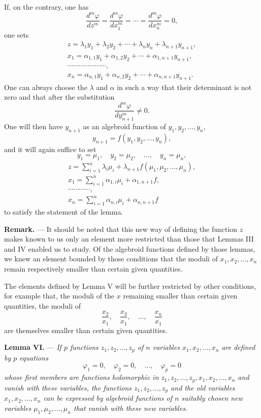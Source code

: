 \documentclass[11pt]{article}
\begin{document}
If, on the contrary, one has
\[
\frac{d^m\varphi}{dz^m}=\frac{d^m\varphi}{dx_1^m}=\cdots=\frac{d^m\varphi}{dx_n^m}=0,
\]
one sets
\[
\begin{gathered}
z=\lambda_1y_1+\lambda_2y_2+\cdots+\lambda_ny_n+\lambda_{n+1}y_{n+1},\\
x_1=\alpha_{1,1}y_1+\alpha_{1,2}y_2+\cdots+\alpha_{1,n+1}y_{n+1},\\
\cdots\cdots\cdots\cdots\cdots\cdots\cdots,\\
x_n=\alpha_{n,1}y_1+\alpha_{n,2}y_2+\cdots+\alpha_{n,n+1}y_{n+1}.
\end{gathered}
\]
One can always choose the $\lambda$ and $\alpha$ in such a way that their determinant is not zero and that after the substitution
\[
\frac{d^m\varphi}{dy_{n+1}^m}\ne0.
\]
One will then have $y_{n+1}$ as an algebroid function of $y_1,y_2,\ldots,y_n$,
\[
y_{n+1}=f(y_1,y_2,\ldots,y_n),
\]
and it will again suffice to set
\[
y_1=\mu_1,
\quad y_2=\mu_2,
\quad \ldots,
\quad y_n=\mu_n,
\]
\[
\begin{gathered}
z=\sum_{i=1}^{n}\lambda_i\mu_i+\lambda_{n+1}f(\mu_1,\mu_2,\ldots,\mu_n),\\
x_1=\sum_{i=1}^{n}\alpha_{1,i}\mu_i+\alpha_{1,n+1}f,\\
\cdots\cdots\cdots\cdots,\\
x_n=\sum_{i=1}^{n}\alpha_{n,i}\mu_i+\alpha_{n,n+1}f
\end{gathered}
\]
to satisfy the statement of the lemma.

\medskip
\noindent\textbf{Remark.} — It should be noted that this new way of defining the function $z$ makes known to us only an element more restricted than those that Lemmas III and IV enabled us to study. Of the algebroid functions defined by those lemmas, we knew an element bounded by those conditions that the moduli of $x_1,x_2,\ldots,x_n$ remain respectively smaller than certain given quantities.

The elements defined by Lemma V will be further restricted by other conditions, for example that, the moduli of the $x$ remaining smaller than certain given quantities, the moduli of
\[
\frac{x_2}{x_1},\quad \frac{x_3}{x_1},\quad \ldots,
\quad \frac{x_n}{x_1}
\]
are themselves smaller than certain given quantities.

\medskip
\noindent\textbf{Lemma VI.} — \emph{If $p$ functions $z_1,z_2,\ldots,z_p$ of $n$ variables $x_1,x_2,\ldots,x_n$ are defined by $p$ equations}
\[
\varphi_1=0,
\quad \varphi_2=0,
\quad \ldots,
\quad \varphi_p=0
\]
\emph{whose first members are functions holomorphic in $z_1,z_2,\ldots,z_p,x_1,x_2,\ldots,x_n$ and vanish with these variables, the functions $z_1,z_2,\ldots,z_p$ and the old variables $x_1,x_2,\ldots,x_n$ can be expressed by algebroid functions of $n$ suitably chosen new variables $\mu_1,\mu_2,\ldots,\mu_n$ that vanish with these new variables.}
\end{document}
